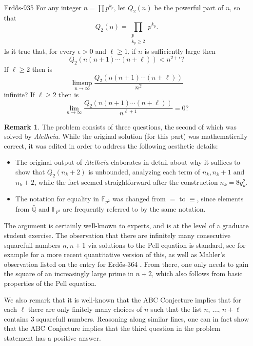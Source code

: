 \documentclass{article}
\theoremstyle{plain}
\theoremstyle{definition}
\newtheorem{remark}{Remark}[section]
\newcommand{\Aletheia}{\emph{Aletheia}}
\begin{document}
\begin{problem}{Erdős-935 \cite{Er76d}}
    For any integer $n=\prod p^{k_p}$, let $Q_2(n)$ be the powerful part of $n$, so that\[Q_2(n) = \prod_{\substack{p\\ k_p\geq 2}}p^{k_p}.\]Is it true that, for every $\epsilon>0$ and $\ell\geq 1$, if $n$ is sufficiently large then\[Q_2(n(n+1)\cdots(n+\ell))<n^{2+\epsilon}?\]If $\ell\geq 2$ then is\[\limsup_{n\to \infty}\frac{Q_2(n(n+1)\cdots(n+\ell))}{n^2}\]infinite? If $\ell\geq 2$ then is\[\lim_{n\to \infty}\frac{Q_2(n(n+1)\cdots(n+\ell))}{n^{\ell+1}}=0?\]
\end{problem}
\begin{remark}
The problem consists of three questions, the second of which was solved by {\Aletheia}. While the original solution (for this part) was mathematically correct, it was edited in order to address the following aesthetic details:
\begin{itemize}
    \item The original output of {\Aletheia} elaborates in detail about why it suffices to show that $Q_{2}(n_{k}+2)$ is unbounded, analyzing each term of $n_{k},n_{k}+1$ and $n_{k}+2$, while the fact seemed straightforward after the construction $n_{k}=8y_{k}^2$.
    \item The notation for equality in $\mathbb F_{p^2}$ was changed from $=$ to $\equiv$, since elements from $\bar{\mathbb Q}$ and $\mathbb F_{p^2}$ are frequently referred to by the same notation. 
\end{itemize}
The argument is certainly well-known to experts, and is at the level of a graduate student exercise. The observation that there are infinitely many consecutive squarefull numbers $n,n+1$ via solutions to the Pell equation is standard, see for example \cite{reuss2014pairskfreenumbersconsecutive} for a more recent quantitative version of this, as well as Mahler's observation listed on the entry for Erdős-364 \cite{BloomErdos364}. From there, one only needs to gain the square of an increasingly large prime in $n+2$, which also follows from basic properties of the Pell equation. 

We also remark that it is well-known that the ABC Conjecture implies that for each $\ell$ there are only finitely many choices of $n$ such that the list $n,\,\ldots,\,n+\ell$ contains $3$ squarefull numbers. Reasoning along similar lines, one can in fact show that the ABC Conjecture implies that the third question in the problem statement has a positive answer.

\end{remark}
\end{document}
